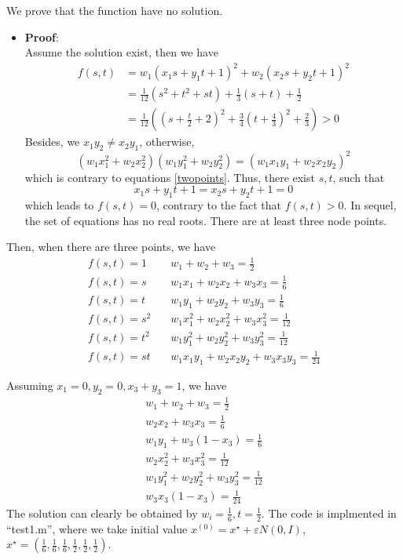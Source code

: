 \documentclass[conference,onecolumn, 12pt]{IEEEtran}
\begin{document}
We prove that the function have no solution.
\begin{itemize}
    \item {\bf Proof}:\\
    Assume the solution exist, then we have 
    \begin{equation}
        \begin{split}
            f(s,t)&=w_1(x_1s+y_1t+1)^2+w_2(x_2s+y_2t+1)^2\\
            &=\frac{1}{12}(s^2+t^2+st)+\frac{1}{3}(s+t)+\frac{1}{2}\\
            &=\frac{1}{12}((s+\frac{t}{2}+2)^2+\frac{3}{4}(t+\frac{4}{3})^2+\frac{2}{3})>0
        \end{split}
    \end{equation}
    Besides, we $x_1y_2\neq x_2y_1$, otherwise, $$(w_1x_1^2+w_2x_2^2)(w_1y_1^2+w_2y_2^2)=( w_1x_1y_1+w_2x_2y_2)^2$$
    which is contrary to equations \ref{twopoints}. Thus, there exist $s,t$, such that$$x_1s+y_1t+1=x_2s+y_2t+1=0$$which leads to $f(s,t)=0$, contrary to the fact that $f(s,t)>0$.
    In sequel, the set of equations has no real roots. There are at least three node points.
\end{itemize}

Then, when there are three points, we have
\begin{subequations}
    \label{threeeq}
    \begin{align}
        f(s,t)=1&\quad w_1+w_2+w_3=\frac{1}{2}\label{threeeq1}\\
        f(s,t)=s&\quad w_1x_1+w_2x_2+w_3x_3=\frac{1}{6}\label{threeeq2}\\
        f(s,t)=t&\quad w_1y_1+w_2y_2+w_3y_3=\frac{1}{6}\label{threeeq3}\\
        f(s,t)=s^2&\quad w_1x_1^2+w_2x_2^2+w_3x_3^2=\frac{1}{12}\label{threeeq4}\\
        f(s,t)=t^2&\quad w_1y_1^2+w_2y_2^2+w_3y_3^2=\frac{1}{12}\label{threeeq5}\\
        f(s,t)=st&\quad w_1x_1y_1+w_2x_2y_2+w_3x_3y_3=\frac{1}{24}\label{threeeq6}
    \end{align}
\end{subequations}

Assuming $x_1=0,y_2=0,x_3+y_3=1$, we have
\begin{subequations}
\begin{align}
    w_1+w_2+w_3=\frac{1}{2}\\
    w_2x_2+w_3x_3=\frac{1}{6}\\
w_1y_1+w_3(1-x_3)=\frac{1}{6}\\
w_2x_2^2+w_3x_3^2=\frac{1}{12}\\
w_1y_1^2+w_2y_2^2+w_3y_3^2=\frac{1}{12}\\
w_3x_3(1-x_3)=\frac{1}{24}
\end{align}    
\end{subequations}
The solution can clearly be obtained by $w_i=\frac{1}{6},t=\frac{1}{2}$. The code is implmented in ``test1.m'', where we take initial value $x^{(0)}=x^\star+\varepsilon N(0,I)$, $x^\star=(\frac{1}{6},\frac{1}{6},\frac{1}{6},\frac{1}{2},\frac{1}{2},\frac{1}{2})$.
\end{document}
